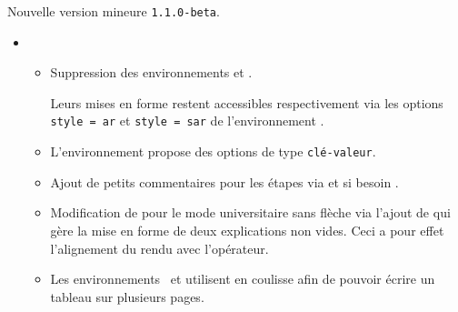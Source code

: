 Nouvelle version mineure \verb+1.1.0-beta+.

\begin{itemize}[itemsep=.5em]
    \item {}
    \begin{itemize}[itemsep=.5em]
        \item Suppression des environnements  et .

              \smallskip

              Leurs mises en forme restent accessibles respectivement via les options \verb+style = ar+ et \verb+style = sar+ de l'environnement .


        \item L'environnement  propose des options de type \texttt{clé-valeur}.


        \item Ajout de petits commentaires pour les étapes via  et si besoin .


        \item Modification de  pour le mode universitaire sans flèche via l'ajout de  qui gère la mise en forme de deux explications non vides.
              Ceci a pour effet l'alignement du rendu avec l'opérateur.


        \item Les environnements  et  utilisent  en coulisse afin de pouvoir écrire un tableau sur plusieurs pages.
    \end{itemize}




\end{itemize}
